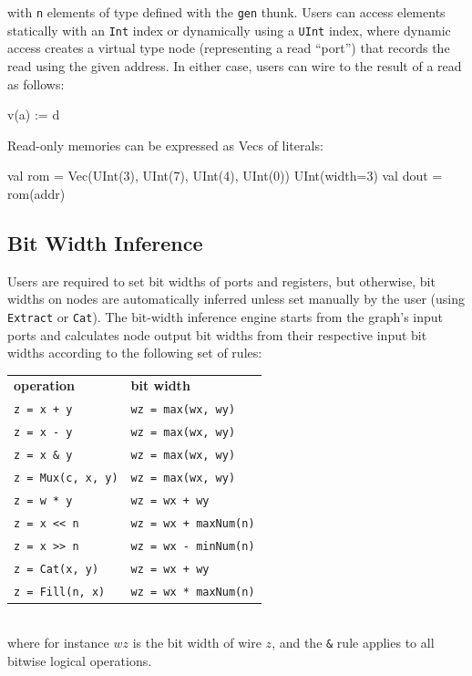 \documentclass[10pt,twocolumn]{article}
\def\code#1{{\small\tt #1}}
\begin{document}
\noindent
with \code{n} elements of type defined with the \code{gen} thunk.
Users can access elements statically with an \code{Int} index or
dynamically using a \code{UInt} index, 
where dynamic access creates a virtual type node (representing a read
``port'') that records the read using the given address.  In either case,
users can wire to the result of a read as follows:

\begin{scala}
v(a) := d
\end{scala}

Read-only memories can be expressed as Vecs of literals:

\begin{scala}
val rom = Vec(UInt(3), UInt(7), UInt(4), UInt(0)) { UInt(width=3) }
val dout = rom(addr)
\end{scala}


\subsection{Bit Width Inference}

Users are required to set bit widths of ports and registers, but otherwise,
bit widths on nodes are automatically inferred unless set manually by
the user (using \code{Extract} or \code{Cat}).
The bit-width inference engine starts from the graph's input ports and 
calculates node output bit widths from their respective input bit widths according to the following set of rules:\\[-2mm]

{\small
\begin{tabular}{ll}
{\bf operation} & {\bf bit width} \\ 
\verb|z = x + y| & \verb+wz = max(wx, wy)+ \\
\verb+z = x - y+ & \verb+wz = max(wx, wy)+\\
\verb+z = x & y+ & \verb+wz = max(wx, wy)+ \\
\verb+z = Mux(c, x, y)+ & \verb+wz = max(wx, wy)+ \\
\verb+z = w * y+ & \verb!wz = wx + wy! \\
\verb+z = x << n+ & \verb!wz = wx + maxNum(n)! \\
\verb+z = x >> n+ & \verb+wz = wx - minNum(n)+ \\
\verb+z = Cat(x, y)+ & \verb!wz = wx + wy! \\
\verb+z = Fill(n, x)+ & \verb+wz = wx * maxNum(n)+ \\
\end{tabular}
}
\\[1mm]
\noindent  
where for instance $wz$ is the bit width of wire $z$, and the \verb+&+
rule applies to all bitwise logical operations.
\end{document}
